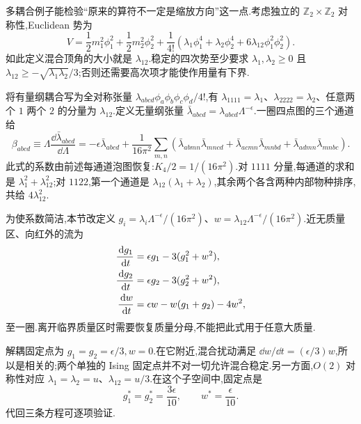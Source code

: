 
多耦合例子能检验“原来的算符不一定是缩放方向”这一点.考虑独立的 $\mathbb Z_2\times\mathbb Z_2$ 对称性,Euclidean 势为
\begin{equation}
 V=\frac12m_1^2\phi_1^2+\frac12m_2^2\phi_2^2+
 \frac1{4!}\left(\lambda_1\phi_1^4+\lambda_2\phi_2^4
                    +6\lambda_{12}\phi_1^2\phi_2^2\right).
 \label{eq:two-scalar-rg-potential}
\end{equation}
如此定义混合顶角的大小就是 $\lambda_{12}$.稳定的四次势至少要求 $\lambda_1,\lambda_2\geq0$ 且
$\lambda_{12}\geq-\sqrt{\lambda_1\lambda_2}/3$;否则还需要高次项才能使作用量有下界.

将有量纲耦合写为全对称张量 $\lambda_{abcd}\phi_a\phi_b\phi_c\phi_d/4!$,有
$\lambda_{1111}=\lambda_1$、$\lambda_{2222}=\lambda_2$、任意两个 $1$ 两个 $2$ 的分量为 $\lambda_{12}$.定义无量纲张量 $\bar\lambda_{abcd}=\lambda_{abcd}\Lambda^{-\epsilon}$.一圈四点图的三个通道给
\begin{equation}
 \beta_{abcd}\equiv\Lambda\frac{\dd\bar\lambda_{abcd}}{\dd\Lambda}
 =-\epsilon\bar\lambda_{abcd}+\frac1{16\pi^2}
 \sum_{m,n}\left(\bar\lambda_{abmn}\bar\lambda_{mncd}
 +\bar\lambda_{acmn}\bar\lambda_{mnbd}
 +\bar\lambda_{admn}\bar\lambda_{mnbc}\right).
 \label{eq:two-scalar-tensor-beta}
\end{equation}
此式的系数由前述每通道泡图恢复:$K_4/2=1/(16\pi^2)$.对 $1111$ 分量,每通道的求和是 $\lambda_1^2+\lambda_{12}^2$;对 $1122$,第一个通道是 $\lambda_{12}(\lambda_1+\lambda_2)$,其余两个各含两种内部物种排序,共给 $4\lambda_{12}^2$.

为使系数简洁,本节改定义
$g_i=\lambda_i\Lambda^{-\epsilon}/(16\pi^2)$、$w=\lambda_{12}\Lambda^{-\epsilon}/(16\pi^2)$.近无质量区、向红外的流为
\begin{align}
 \frac{\,\mathrm d g_1}{\,\mathrm d t}&=\epsilon g_1-3(g_1^2+w^2),\notag\\
 \frac{\,\mathrm d g_2}{\,\mathrm d t}&=\epsilon g_2-3(g_2^2+w^2),\notag\\
 \frac{\,\mathrm d w}{\,\mathrm d t}&=\epsilon w-w(g_1+g_2)-4w^2,
 \label{eq:two-scalar-coupling-flow}
\end{align}
至一圈.离开临界质量区时需要恢复质量分母,不能把此式用于任意大质量.

解耦固定点为 $g_1=g_2=\epsilon/3,w=0$.在它附近,混合扰动满足
$\dd w/\dd t=(\epsilon/3)w$,所以是相关的;两个单独的 Ising 固定点并不对一切允许混合稳定.另一方面,$O(2)$ 对称性对应
$\lambda_1=\lambda_2=u$、$\lambda_{12}=u/3$.在这个子空间中,固定点是
\begin{equation}
 g_1^*=g_2^*=\frac{3\epsilon}{10},\qquad
 w^*=\frac\epsilon{10}.
 \label{eq:two-scalar-o2-fixed}
\end{equation}
代回三条方程可逐项验证.

